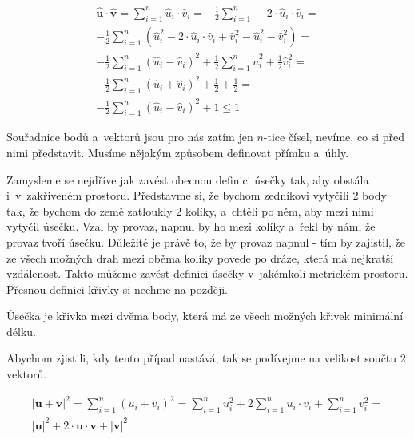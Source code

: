 \documentclass{book}
\newcommand{\vect}[1]{\boldsymbol{#1}}
\newcommand{\unitvect}[1]{\hat{\boldsymbol{#1}}}
\begin{document}
\begin{equation}
\label{eq:skalarni_soucin_2}
\begin{split}
\unitvect{u} \cdot \unitvect{v} = \sum_{i=1}^{n} \hat{u}_i \cdot \hat{v}_i = -\frac{1}{2} \sum_{i=1}^{n} -2 \cdot \hat{u}_i \cdot \hat{v}_i = \\
-\frac{1}{2} \sum_{i=1}^{n} \left(\hat{u}_i^2 - 2 \cdot \hat{u}_i \cdot \hat{v}_i + \hat{v}_i^2 - \hat{u}_i^2 - \hat{v}_i^2 \right) = \\
-\frac{1}{2} \sum_{i=1}^{n} (\hat{u}_i - \hat{v}_i)^2 + \frac{1}{2} \sum_{i=1}^{n} \hat{u}_i^2 + \frac{1}{2} \hat{v}_i^2 = \\
-\frac{1}{2} \sum_{i=1}^{n} (\hat{u}_i + \hat{v}_i)^2 + \frac{1}{2} + \frac{1}{2} =  \\
-\frac{1}{2} \sum_{i=1}^{n} (\hat{u}_i - \hat{v}_i)^2 + 1 \leq 1
\end{split}
\end{equation}

Souřadnice bodů a~vektorů jsou pro nás zatím jen \(n\)-tice čísel, nevíme, co si před nimi představit. Musíme nějakým způsobem definovat přímku a~úhly.

Zamysleme se nejdříve jak zavést obecnou definici úsečky tak, aby obstála i~v~zakřiveném prostoru. Představme si, že bychom zedníkovi vytyčili 2 body tak, že bychom do země zatloukly 2 kolíky, a~chtěli po něm, aby mezi nimi vytyčil
úsečku. Vzal by provaz, napnul by ho mezi kolíky a~řekl by nám, že provaz tvoří úsečku. Důležité je právě to, že by provaz napnul - tím by zajistil, že ze všech možných drah mezi oběma kolíky povede po dráze, která má
nejkratší vzdálenost. Takto můžeme zavést definici úsečky v~jakémkoli metrickém prostoru. Přesnou definici křivky si nechme na později.

\begin{fact}
Úsečka je křivka mezi dvěma body, která má ze všech možných křivek minimální délku.
\end{fact}

Abychom zjistili, kdy tento případ nastává, tak se podívejme na velikost součtu 2 vektorů.

\begin{equation}
\label{eq:delka_souctu_vektoru}
\begin{split}
|\vect{u} + \vect{v}|^2 = \sum_{i=1}^{n} (u_i + v_i)^2 = \sum_{i=1}^{n} u_i^2 + 2 \sum_{i=1}^{n} u_i \cdot v_i + \sum_{i=1}^{n} v_i^2 = \\
|\vect{u}|^2 + 2 \cdot \vect{u} \cdot \vect{v} + |\vect{v}|^2
\end{split}
\end{equation}
\end{document}
